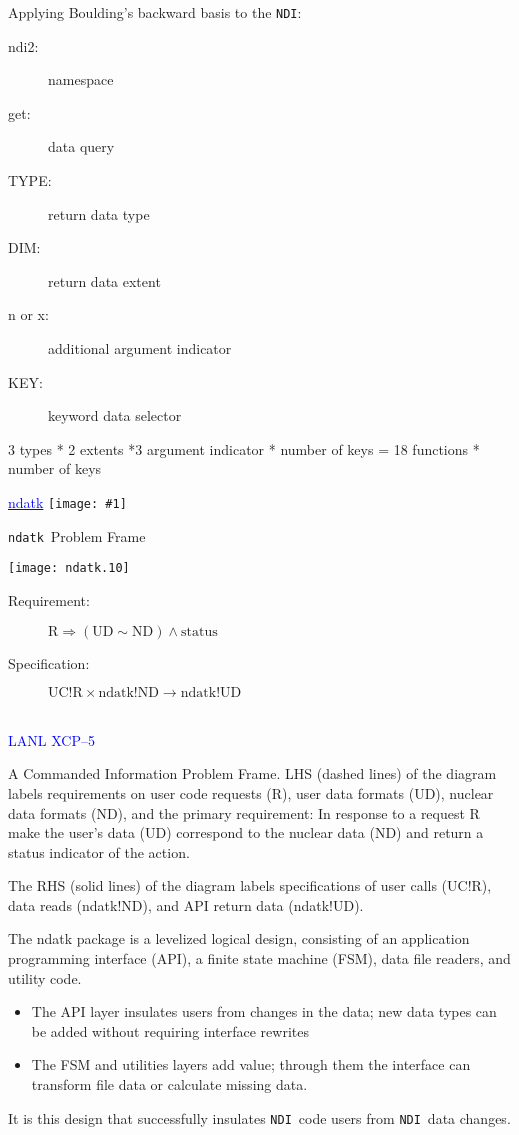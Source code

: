 \documentclass[clock]{slides}
\newenvironment{xslide}[1][logo.jpg]{\begin{slide} \tiny
\textcolor{blue}{\underline{ndatk}} \hfill
\texttt{[image: \#1]}
\normalsize}{\vfill\tiny
\textcolor{blue}{\hrulefill \\LANL XCP--5}
\end{slide}}
\newcommand{\ndatk}{\texttt{ndatk}}
\newcommand{\NDI}{\texttt{NDI}}
\begin{document}
\begin{note}\small

Applying Boulding's backward basis to the \NDI:
\begin{description}
\item[ndi2: ] namespace
\item[get: ] data query
\item[TYPE: ] return data type  
\item[DIM: ] return data extent
\item[n or x: ] additional argument indicator
\item[KEY: ] keyword data selector
\end{description}

3 types * 2 extents *3 argument indicator * number of keys =
18 functions * number of keys

\end{note}
 
\begin{xslide}
\begin{center}\Large
\ndatk\ Problem Frame
\end{center}

\begin{center}
\texttt{[image: ndatk.10]}
\end{center}

\small
\begin{description}
\item[Requirement: ] $\mathrm{R} \Rightarrow (\mathrm{UD} \sim
  \mathrm{ND}) \wedge \mathrm{status}$
\item[Specification: ] $\mathrm{UC!R} \times \mathrm{ndatk!ND}
  \rightarrow \mathrm{ndatk!UD}$
\end{description}

\end{xslide}

\begin{note}\small
A Commanded Information Problem Frame.  LHS (dashed lines) of the
diagram labels requirements on user code requests (R), user data
formats (UD), nuclear data formats (ND), and the primary requirement:
In response to a request R make the user's data (UD) correspond to the
nuclear data (ND) and return a status indicator of the action.

The RHS (solid lines) of the diagram labels specifications of user
calls (UC!R), data reads (ndatk!ND), and API return data (ndatk!UD).

The ndatk package is a levelized logical design, consisting of an
application programming interface (API), a finite state machine (FSM),
data file readers, and utility code.
\begin{itemize}
\item The API layer insulates users from changes in the data; new data
  types can be added without requiring interface rewrites
\item The FSM and utilities layers add value; through them the interface
  can transform file data or calculate missing data.
\end{itemize}
It is this design that successfully insulates \NDI\ code users from \NDI\
data changes.
\end{note}
\end{document}
